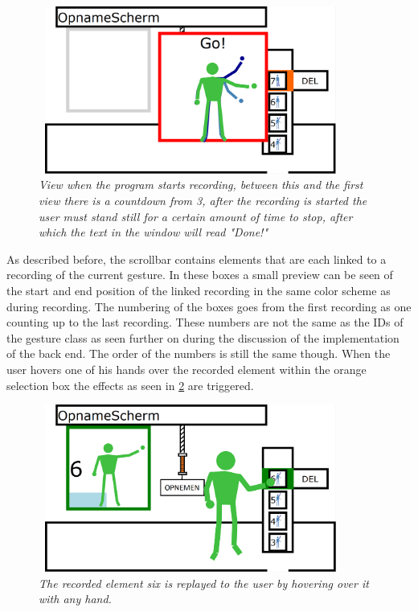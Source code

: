 \begin{figure}[H]
	\begin{center}
		\includegraphics[width=10cm, height=5.5cm]{figures/6_record_start.png}
		\caption{\emph{View when the program starts recording, between this and the first view there is a countdown from 3, after the recording is started the user must stand still for a certain amount of time to stop, after which the text in the window will read "Done!"}}
		\label{last recording screen}
	\end{center}
\end{figure}

As described before, the scrollbar contains elements that are each linked to a recording of the current gesture. In these boxes a small preview can be seen of the start and end position of the linked recording in the same color scheme as during recording. The numbering of the boxes goes from the first recording as one counting up to the last recording. These numbers are not the same as the IDs of the gesture class as seen further on during the discussion of the implementation of the back end. The order of the numbers is still the same though. When the user hovers one of his hands over the recorded element within the orange selection box the effects as seen in \ref{replay of element six} are triggered.\\

\begin{figure}[H]
	\begin{center}
		\includegraphics[width=10cm, height=5.5cm]{figures/11_replay_recording.png}
		\caption{\emph{The recorded element six is replayed to the user by hovering over it with any hand.}}
		\label{replay of element six}
	\end{center}
\end{figure}

